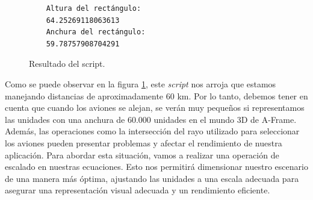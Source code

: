 \documentclass[a4paper, 11pt]{book}
\begin{document}
\begin{figure}[h]
	\centering
	\begin{verbatim}
	Altura del rectángulo:
	64.25269118063613
	Anchura del rectángulo:
	59.78757908704291
	\end{verbatim}
	\caption{Resultado del script.
	\label{codigo:resultadoDimensiones}
	}
\end{figure}
Como se puede observar en la figura \ref{codigo:resultadoDimensiones}, este \emph{script} nos arroja que estamos manejando distancias de aproximadamente 60 km. 
Por lo tanto, debemos tener en cuenta que cuando los aviones se alejan, se verán muy pequeños si representamos las unidades con una anchura de 60.000 unidades en el mundo 3D de A-Frame. Además, las operaciones como la intersección del rayo utilizado para seleccionar los aviones pueden presentar problemas y afectar el rendimiento de nuestra aplicación.
Para abordar esta situación, vamos a realizar una operación de escalado en nuestras ecuaciones. Esto nos permitirá dimensionar nuestro escenario de una manera más óptima, ajustando las unidades a una escala adecuada para asegurar una representación visual adecuada y un rendimiento eficiente.
\end{document}

